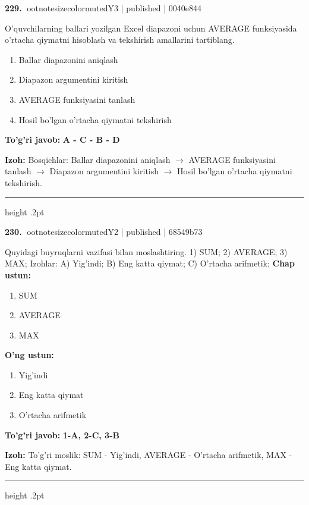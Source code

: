 \documentclass[10pt,a4paper]{article}
\begin{document}
\textbf{\color{ink}229.} {ootnotesizecolor{muted}Y3 | published | 0040e844}
\par
O'quvchilarning ballari yozilgan Excel diapazoni uchun AVERAGE funksiyasida o'rtacha qiymatni hisoblash va tekshirish amallarini tartiblang.
\begin{enumerate}[label=\Alph*),leftmargin=9mm]
\item Ballar diapazonini aniqlash
\item Diapazon argumentini kiritish
\item AVERAGE funksiyasini tanlash
\item Hosil bo'lgan o'rtacha qiymatni tekshirish
\end{enumerate}
\begin{tcolorbox}[enhanced,breakable,colback=teal!4,colframe=teal!55!black,boxrule=0.45pt,arc=1.2mm,left=2.8mm,right=2.8mm,top=2mm,bottom=2mm]
\textbf{\color{teal}To'g'ri javob:} \textbf{A - C - B - D}
\par\smallskip
\textbf{Izoh:} Bosqichlar: Ballar diapazonini aniqlash \ensuremath{\rightarrow} AVERAGE funksiyasini tanlash \ensuremath{\rightarrow} Diapazon argumentini kiritish \ensuremath{\rightarrow} Hosil bo'lgan o'rtacha qiymatni tekshirish.
\end{tcolorbox}
\vspace{2mm}\hrule height .2pt\vspace{2mm}

\textbf{\color{ink}230.} {ootnotesizecolor{muted}Y2 | published | 68549b73}
\par
Quyidagi buyruqlarni vazifasi bilan moslashtiring.  1) SUM;  2) AVERAGE;  3) MAX;  Izohlar: A) Yig'indi;  B) Eng katta qiymat;  C) O'rtacha arifmetik;
\textbf{Chap ustun:}\begin{enumerate}[label=\arabic*),leftmargin=9mm]
\item SUM
\item AVERAGE
\item MAX
\end{enumerate}
\textbf{O'ng ustun:}\begin{enumerate}[label=\Alph*),leftmargin=9mm]
\item Yig'indi
\item Eng katta qiymat
\item O'rtacha arifmetik
\end{enumerate}
\begin{tcolorbox}[enhanced,breakable,colback=teal!4,colframe=teal!55!black,boxrule=0.45pt,arc=1.2mm,left=2.8mm,right=2.8mm,top=2mm,bottom=2mm]
\textbf{\color{teal}To'g'ri javob:} \textbf{1-A, 2-C, 3-B}
\par\smallskip
\textbf{Izoh:} To'g'ri moslik: SUM - Yig'indi, AVERAGE - O'rtacha arifmetik, MAX - Eng katta qiymat.
\end{tcolorbox}
\vspace{2mm}\hrule height .2pt\vspace{2mm}
\end{document}
